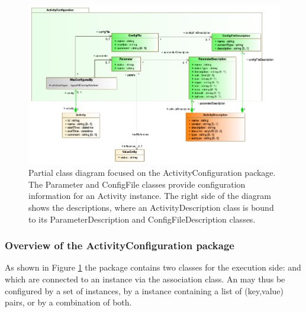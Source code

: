 \begin{figure}[hbt]
\centering
\includegraphics[width=1.0\textwidth]{figures/2019-05-28_ActivityConfiguration.png}
\caption[Partial class diagram focused on the ActivityConfiguration package.]{Partial class diagram focused on the ActivityConfiguration package. The Parameter and ConfigFile classes provide configuration information for an Activity instance. The right side of the diagram shows the descriptions, where an ActivityDescription class is bound to its ParameterDescription and ConfigFileDescription classes.}
\label{fig:activityconfig}
\end{figure}

\subsubsection{Overview of the ActivityConfiguration package} \label{sec:configurationpackage}

As shown in Figure \ref{fig:activityconfig} the  package contains two classes for the execution side:  and  which are connected to an  instance via the  association class.
An  may thus be configured by a set of  instances, by a  instance containing a list of (key,value) pairs, or by a combination of both.


